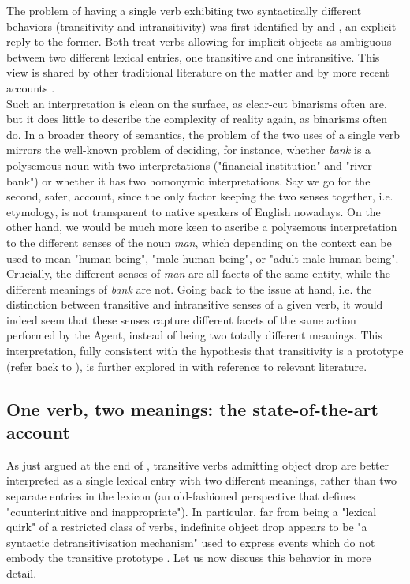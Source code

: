 The problem of having a single verb exhibiting two syntactically different behaviors (transitivity and intransitivity) was first identified by \textcite{fodor1980functional} and \textcite{dowty1981quantification}, an explicit reply to the former. Both treat verbs allowing for implicit objects as ambiguous between two different lexical entries, one transitive and one intransitive. This view is shared by other traditional literature on the matter \parencite{Cote1996, Mittwoch1982, vanvalinlapolla1997syntax, brisson1994licensing} and by more recent accounts \parencite{PethoKardos2006, BourmayanRecanati2013}.\\
Such an interpretation is clean on the surface, as clear-cut binarisms often are, but it does little to describe the complexity of reality \textemdash again, as binarisms often do. In a broader theory of semantics, the problem of the two uses of a single verb mirrors the well-known problem of deciding, for instance, whether \textit{bank} is a polysemous noun with two interpretations ("financial institution" and "river bank") or whether it has two homonymic interpretations. Say we go for the second, safer, account, since the only factor keeping the two senses together, i.e. etymology, is not transparent to native speakers of English nowadays. On the other hand, we would be much more keen to ascribe a polysemous interpretation to the different senses of the noun \textit{man}, which depending on the context can be used to mean "human being", "male human being", or "adult male human being". Crucially, the different senses of \textit{man} are all facets of the same entity, while the different meanings of \textit{bank} are not. Going back to the issue at hand, i.e. the distinction between transitive and intransitive senses of a given verb, it would indeed seem that these senses capture different facets of the same action performed by the Agent, instead of being two totally different meanings. This interpretation, fully consistent with the hypothesis that transitivity is a prototype (refer back to ), is further explored in  with reference to relevant literature.


\subsection{One verb, two meanings: the state-of-the-art account} 

As just argued at the end of , transitive verbs admitting object drop are better interpreted as a single lexical entry with two different meanings, rather than two separate entries in the lexicon (an old-fashioned perspective that \textcite[60]{Lorenzetti2008} defines "counterintuitive and inappropriate"). In particular, far from being a "lexical quirk" of a restricted class of verbs, indefinite object drop appears to be "a syntactic detransitivisation mechanism" used to express events which do not embody the transitive prototype \parencite[134]{Naess2007}. Let us now discuss this behavior in more detail.


